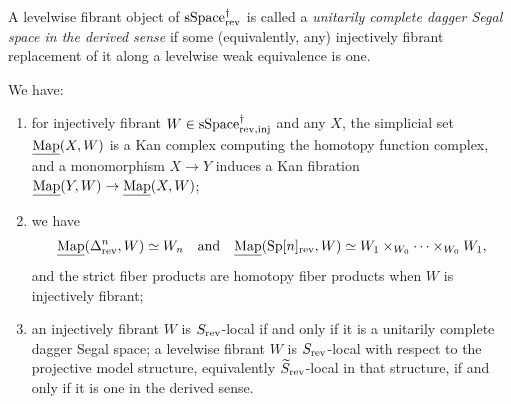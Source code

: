 \documentclass[a4paper,dvipdfmx,11pt]{amsart}
\begin{document}
\begin{definition}
  A levelwise fibrant object of $\mathrm{sSpace}^{\dag}_{\mathrm{rev}}$ is called a \emph{unitarily complete dagger Segal space in the derived sense} if some (equivalently, any) injectively fibrant replacement of it along a levelwise weak equivalence is one.
\end{definition}

\begin{lemma}\label{h1.lem.local-objects}
  We have:
  \begin{enumerate}
    \item for injectively fibrant $W \in \mathrm{sSpace}^{\dag}_{\mathrm{rev},\mathrm{inj}}$ and any $X$, the simplicial set $\underline{\operatorname{Map}}(X,W)$ is a Kan complex computing the homotopy function complex, and a monomorphism $X\to Y$ induces a Kan fibration $\underline{\operatorname{Map}}(Y,W)\to\underline{\operatorname{Map}}(X,W)$;
    \item we have 
    \begin{align}
      \underline{\operatorname{Map}}(\Delta^n_{\mathrm{rev}},W)\simeq W_n 
      \quad \text{and} \quad 
      \underline{\operatorname{Map}}(\mathrm{Sp}[n]_{\mathrm{rev}},W)\simeq W_1\times_{W_0}\cdots\times_{W_0}W_1,
    \end{align}
    and the strict fiber products are homotopy fiber products when $W$ is injectively fibrant;
    \item an injectively fibrant $W$ is $S_{\mathrm{rev}}$-local if and only if it is a unitarily complete dagger Segal space;
    a levelwise fibrant $W$ is $S_{\mathrm{rev}}$-local with respect to the projective model structure, equivalently $\widetilde S_{\mathrm{rev}}$-local in that structure, if and only if it is one in the derived sense.
  \end{enumerate}
\end{lemma}
\end{document}
